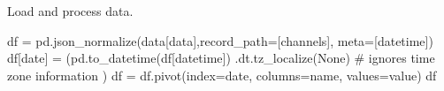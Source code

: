 \documentclass[
  letterpaper,
  DIV=11,
  numbers=noendperiod,
  oneside]{scrreprt}
\newenvironment{Shaded}{\begin{snugshade}}{\end{snugshade}}
\newcommand{\CommentTok}[1]{\textcolor[rgb]{0.37,0.37,0.37}{#1}}
\newcommand{\NormalTok}[1]{\textcolor[rgb]{0.00,0.23,0.31}{#1}}
\newcommand{\OperatorTok}[1]{\textcolor[rgb]{0.37,0.37,0.37}{#1}}
\newcommand{\StringTok}[1]{\textcolor[rgb]{0.13,0.47,0.30}{#1}}
\newcommand{\VariableTok}[1]{\textcolor[rgb]{0.07,0.07,0.07}{#1}}
\begin{document}
Load and process data.

\begin{Shaded}
\begin{Highlighting}[]
\NormalTok{df }\OperatorTok{=}\NormalTok{ pd.json\_normalize(data[}\StringTok{\textquotesingle{}data\textquotesingle{}}\NormalTok{],record\_path}\OperatorTok{=}\NormalTok{[}\StringTok{\textquotesingle{}channels\textquotesingle{}}\NormalTok{], meta}\OperatorTok{=}\NormalTok{[}\StringTok{\textquotesingle{}datetime\textquotesingle{}}\NormalTok{])}
\NormalTok{df[}\StringTok{\textquotesingle{}date\textquotesingle{}}\NormalTok{] }\OperatorTok{=}\NormalTok{ (pd.to\_datetime(df[}\StringTok{\textquotesingle{}datetime\textquotesingle{}}\NormalTok{])}
\NormalTok{                .dt.tz\_localize(}\VariableTok{None}\NormalTok{)  }\CommentTok{\# ignores time zone information}
\NormalTok{             )}
\NormalTok{df }\OperatorTok{=}\NormalTok{ df.pivot(index}\OperatorTok{=}\StringTok{\textquotesingle{}date\textquotesingle{}}\NormalTok{, columns}\OperatorTok{=}\StringTok{\textquotesingle{}name\textquotesingle{}}\NormalTok{, values}\OperatorTok{=}\StringTok{\textquotesingle{}value\textquotesingle{}}\NormalTok{)}
\NormalTok{df}
\end{Highlighting}
\end{Shaded}
\end{document}
